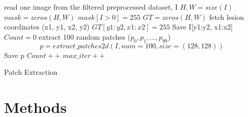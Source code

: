 \documentclass[final,3p,twocolumn,authoryear,sort&compress,times]{maia}
\begin{document}
\begin{algorithm*}[htp]
\centering
\begin{algorithmic}[1]
\STATE read one image from the filtered preprocessed dataset, I
\STATE $H, W = size(I)$
\STATE $mask = zeros(H,W)$
\STATE $mask[I>0]=255$
\STATE $GT = zeros(H,W)$
\STATE fetch lesion coordinates (x1, y1, x2, y2)
\STATE $GT[y1:y2, x1:x2] = 255$
\STATE Save I[y1:y2, x1:x2]
\ENDIF
\STATE $Count=0$
\STATE extract 100 random patches ($p_0,p_1,\dots, p_{99}$) 
$$p = extract\_patches2d(I, num=100, size=(128,128)) $$
\STATE Save p
\STATE $Count++$
\ENDIF
\ENDFOR
\STATE $max\_iter++$
\ENDWHILE
\end{algorithmic}
\caption{Patch Extraction}
\label{alg:patch_extraction}
\end{algorithm*}

\section{Methods}
\label{sec:gan_arch_train}
\end{document}
